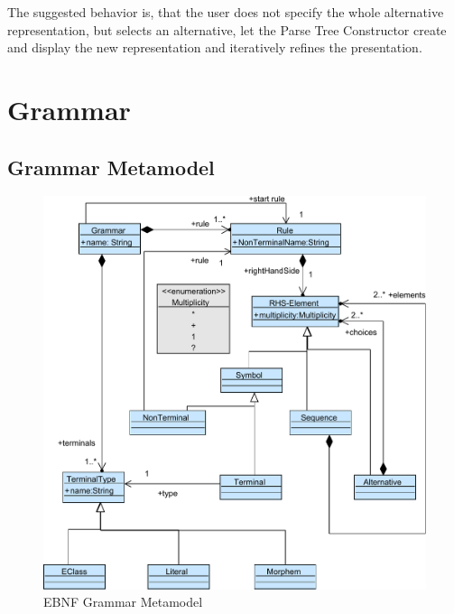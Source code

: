 
The suggested behavior is, that the user does not specify the whole alternative representation, but selects an alternative, let the Parse Tree Constructor create and display the new representation and iteratively refines the presentation. 


\section{Grammar}
\subsection{Grammar Metamodel}
\begin{figure}
\centering
\includegraphics[scale=0.85]{gfx/ex/Grammar_CFG} 
\caption{EBNF Grammar Metamodel}
\label{MM:EBNF}
\end{figure}


